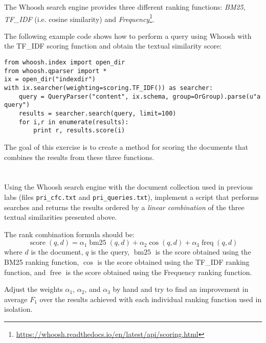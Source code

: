 \documentclass[12pt]{article}
\begin{document}

The Whoosh search engine provides three different ranking functions: \emph{BM25}, \emph{TF\_IDF} (i.e. cosine similarity) and \emph{Frequency}\footnote{\url{https://whoosh.readthedocs.io/en/latest/api/scoring.html}}. 

The following example code shows how to perform a query using Whoosh with the
TF\_IDF scoring function and obtain the textual similarity score:
\begin{verbatim}
from whoosh.index import open_dir
from whoosh.qparser import *
ix = open_dir("indexdir")
with ix.searcher(weighting=scoring.TF_IDF()) as searcher:
    query = QueryParser("content", ix.schema, group=OrGroup).parse(u"a query")
    results = searcher.search(query, limit=100)
    for i,r in enumerate(results):
        print r, results.score(i)
\end{verbatim}

The goal of this exercise is to create a method for scoring the documents that combines the results from these three functions.

\section{}

Using the Whoosh search engine with the document collection used in previous labs (files \texttt{pri\_cfc.txt} and \texttt{pri\_queries.txt}), implement a script that performs searches and returns the results ordered by a \emph{linear combination} of the three textual similarities presented above.

The rank combination formula should be:
\begin{displaymath}
    \operatorname{score}(q,d) = \alpha_1\operatorname{bm25}(q,d) + \alpha_2\operatorname{cos}(q,d) + \alpha_3\operatorname{freq}(q,d)
\end{displaymath}
where $d$ is the document, $q$ is the query, $\operatorname{bm25}$ is the score obtained using the BM25 ranking function, $\operatorname{cos}$ is the score obtained using the TF\_IDF ranking function, and $\operatorname{free}$ is the score obtained using the Frequency ranking function.

Adjust the weights $\alpha_1$, $\alpha_2$, and $\alpha_3$ by hand and try to find an improvement in average $F_1$ over the results achieved with each individual ranking function used in isolation.
\end{document}
